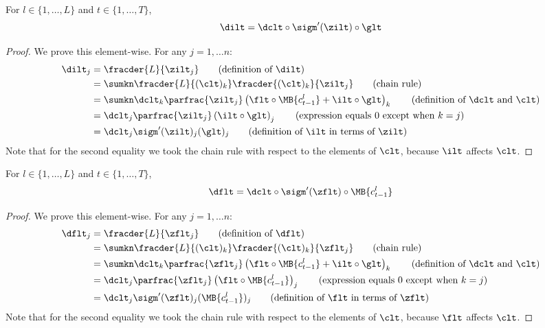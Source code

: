 \begin{lemma}
For $l \in \{1,\dots, L\}$ and $t \in \{1, \dots, T\}$,
\begin{equation}
\dilt = \dclt \circ \sigm'(\zilt) \circ \glt
\end{equation}
\end{lemma}
\begin{proof}
We prove this element-wise. For any $j=1,\dots n$:
\begin{align} 
\dilt_j &= \fracder{L}{\zilt_j} \tag{definition of $\dilt$} \\
&= \sumkn \fracder{L}{(\clt)_k} \fracder{(\clt)_k}{\zilt_j} \tag{chain rule} \\
&= \sumkn \dclt_k \parfrac{\zilt_j} \left( \flt \circ \MB{c^l_{t-1}} + \ilt \circ \glt \right)_k \tag{definition of $\dclt$ and $\clt$} \\
&= \dclt_j \parfrac{\zilt_j} \left( \ilt \circ \glt \right)_j \tag{expression equals 0 except when $k=j$} \\
&= \dclt_j  \sigm'(\zilt)_j  (\glt)_j \tag{definition of $\ilt$ in terms of $\zilt$}
\end{align}
Note that for the second equality we took the chain rule with respect to the elements of $\clt$, because $\ilt$ affects $\clt$.
\end{proof}
\begin{lemma}
For $l \in \{1,\dots, L\}$ and $t \in \{1, \dots, T\}$,
\begin{equation}
\dflt = \dclt \circ \sigm'(\zflt) \circ \MB{c_{t-1}^l}
\end{equation} 
\end{lemma}
\begin{proof}
We prove this element-wise. For any $j=1,\dots n$:
\begin{align} 
\dflt_j &= \fracder{L}{\zflt_j} \tag{definition of $\dflt$} \\
&= \sumkn \fracder{L}{(\clt)_k} \fracder{(\clt)_k}{\zflt_j} \tag{chain rule} \\
&= \sumkn \dclt_k \parfrac{\zflt_j} \left( \flt \circ \MB{c^l_{t-1}} + \ilt \circ \glt \right)_k \tag{definition of $\dclt$ and $\clt$} \\
&= \dclt_j \parfrac{\zflt_j} \left( \flt \circ \MB{c^l_{t-1}} \right)_j \tag{expression equals 0 except when $k=j$} \\
& = \dclt_j \sigm'(\zflt)_j (\MB{c_{t-1}^l})_j \tag{definition of $\flt$ in terms of $\zflt$}
\end{align}
Note that for the second equality we took the chain rule with respect to the elements of $\clt$, because $\flt$ affects $\clt$.
\end{proof}

